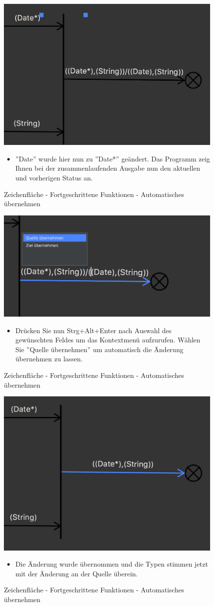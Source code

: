 \begin{figure}[h!]
	\centering
	\includegraphics[width=.6\textwidth]{Quelle2.png}
	\caption{Zeichenfläche - Fortgeschrittene Funktionen - Automatisches übernehmen}
\begin{itemize}	
\item ''Date'' wurde hier nun zu ''Date*'' geändert. Das Programm zeig Ihnen bei der zusammenlaufenden Ausgabe nun den aktuellen und vorherigen Status an. 
\end{itemize}
\end{figure}

\begin{figure}[h!]
	\centering
	\includegraphics[width=.6\textwidth]{Quelle3.png}
	\caption{Zeichenfläche - Fortgeschrittene Funktionen - Automatisches übernehmen}
\begin{itemize}	
\item Drücken Sie nun Strg+Alt+Enter nach Auswahl des gewünschten Feldes um das Kontextmenü aufzurufen. Wählen Sie ''Quelle übernehmen'' um automatisch die Änderung übernehmen zu lassen.
\end{itemize}
\end{figure}

\begin{figure}[h!]
	\centering
	\includegraphics[width=.6\textwidth]{Quelle4.png}
	\caption{Zeichenfläche - Fortgeschrittene Funktionen - Automatisches übernehmen}
\begin{itemize}	
\item Die Änderung wurde übernommen und die Typen stimmen jetzt mit der Änderung an der Quelle überein.
\end{itemize}
\end{figure}

